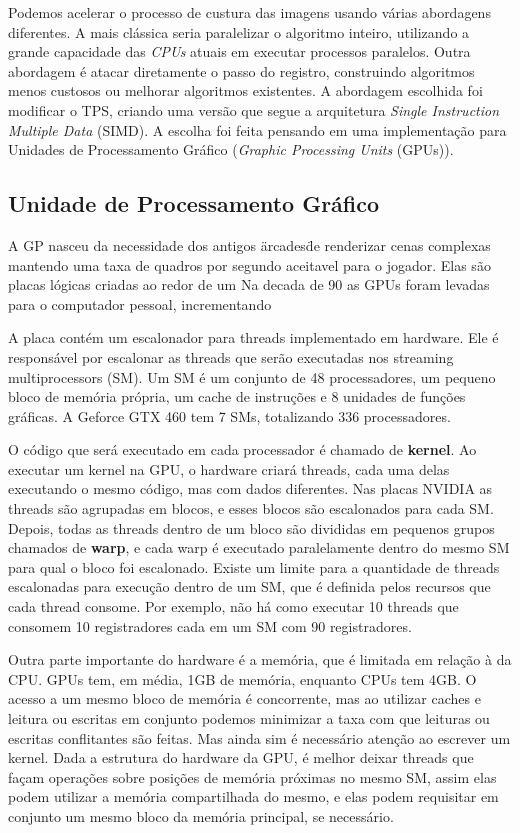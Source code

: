     Podemos acelerar o processo de custura das imagens usando várias abordagens diferentes. A mais clássica seria
paralelizar o algoritmo inteiro, utilizando a grande capacidade das \textit{CPUs} atuais em executar processos paralelos.
Outra abordagem é atacar diretamente o passo do registro, construindo algoritmos menos custosos ou melhorar algoritmos
existentes. A abordagem escolhida foi modificar o TPS, criando uma versão que segue a arquitetura 
\textit{Single Instruction Multiple Data} (SIMD). A escolha foi feita pensando em uma implementação para 
Unidades de Processamento Gráfico (\textit{Graphic Processing Units} (GPUs)).

\subsection{Unidade de Processamento Gráfico}
    A GP nasceu da necessidade dos antigos \"arcades\" de renderizar cenas complexas mantendo uma taxa de quadros por 
segundo aceitavel para o jogador. Elas são placas lógicas criadas ao redor de um Na decada de 90 as GPUs foram levadas para o computador pessoal, incrementando 

A placa contém um escalonador para threads implementado em hardware. Ele é responsável por escalonar as threads que serão
executadas nos streaming multiprocessors (SM). Um SM é um conjunto de 48 processadores, um pequeno bloco de memória própria,
um cache de instruções e 8 unidades de funções gráficas. A Geforce GTX 460 tem 7 SMs, totalizando 336 processadores.

O código que será executado em cada processador é chamado de \textbf{kernel}. Ao executar um kernel na GPU, o 
hardware criará threads, cada uma delas executando o mesmo código, mas com dados diferentes. Nas placas NVIDIA as threads 
são agrupadas em blocos, e esses blocos são escalonados para cada SM. Depois, todas as threads dentro de um bloco são 
divididas em pequenos grupos chamados de \textbf{warp}\cite{paulo}, e cada warp é executado paralelamente dentro do 
mesmo SM para qual o bloco foi escalonado. Existe um limite para a quantidade de threads escalonadas para execução
dentro de um SM, que é definida pelos recursos que cada thread consome. Por exemplo, não há como executar 10 threads
que consomem 10 registradores cada em um SM com 90 registradores.

Outra parte importante do hardware é a memória, que é limitada em relação à da CPU. GPUs tem, em média, 1GB
de memória, enquanto CPUs tem 4GB. O acesso a um mesmo bloco de memória é concorrente, mas ao utilizar caches e leitura ou escritas em
conjunto podemos minimizar a taxa com que leituras ou escritas conflitantes são feitas. Mas ainda sim é necessário atenção ao escrever um
kernel. Dada a estrutura do hardware da GPU, é melhor deixar threads que façam operações sobre posições de memória próximas no mesmo
SM, assim elas podem utilizar a memória compartilhada do mesmo, e elas podem requisitar em conjunto um mesmo bloco da memória principal,
se necessário.

